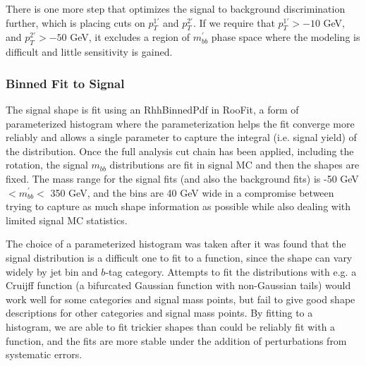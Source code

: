 There is one more step that optimizes the signal to background
discrimination further, which is placing cuts on $p_T^{1'}$ and $p_T^{2'}$.
If we require that $p_T^{1'}>-10$ GeV, and $p_T^{2'}>-50$ GeV, it 
excludes a region of $m_{bb}^{'}$ phase space where the modeling is difficult
and little sensitivity is gained.  








\subsubsection{Binned Fit to Signal}

The signal shape is fit using an RhhBinnedPdf in RooFit, a form of parameterized
histogram where the parameterization helps the fit converge more reliably and allows
a single parameter to capture the integral (i.e. signal yield) of the distribution.
Once the full analysis cut chain has been applied, including the rotation, the 
signal $m_{bb}$ distributions are fit in signal MC and then the shapes are fixed.
The mass range for the signal fits (and also the background fits) is -50 GeV $< m_{bb}^{'}<$ 350 GeV,
and the bins are 40 GeV wide in a compromise between trying to capture as much
shape information as possible while also dealing with limited signal MC statistics.

The choice of a parameterized histogram was taken after it was found that 
the signal distribution is a difficult one to fit to a function, since the shape can vary
widely by jet bin and $b$-tag category.  Attempts to fit the distributions with e.g. a 
Cruijff function (a bifurcated Gaussian function with non-Gaussian tails) would work
well for some categories and signal mass points, but fail to give good shape descriptions
for other categories and signal mass points.  By fitting to a histogram, we are able
to fit trickier shapes than could be reliably fit with a function, and the fits are
more stable under the addition of perturbations from systematic errors.




